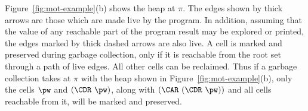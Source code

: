 \documentclass{llncs}
\begin{document}
Figure~\ref{fig:mot-example}(b)  shows the heap at $\pi$.
The edges shown  by thick arrows are those  which are made live by the
program. In addition,  assuming that
the value of any reachable part of the program result may be explored
or printed, the edges marked by thick dashed arrows are also live.
A cell  is  marked and preserved  during  garbage collection,  only  if it  is
reachable from the  root set through a path of  live edges.  All other
cells can be  reclaimed.  Thus if  a garbage collection takes
at $\pi$ with the    heap   shown   in
Figure~\ref{fig:mot-example}(b), only the cells $\pw$ and $(\CDR~ \pw)$, along with $(\CAR~(\CDR~\pw))$ and all cells reachable from it,
will be marked and preserved.



\newcommand{\nilfigure}
{\scalebox{0.75}{
\psset{unit=1mm,nodesep=0mm,labelsep=0.5mm}
\begin{pspicture}(0,0)(1,1)
\putnode{start}{origin}{0}{0}{}
\putnode{stop}{origin}{10}{10}{}
\ncline[offsetB=0,nodesepB=0,linewidth=.7]{-}{start}{stop} %
\end{pspicture}
}}
\end{document}
